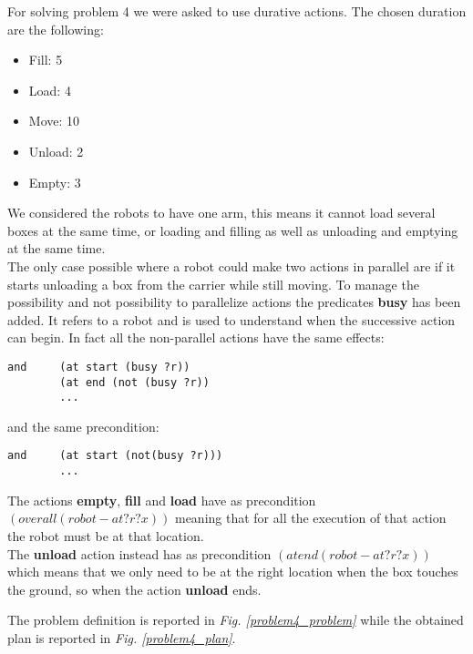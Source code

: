 For solving problem 4 we were asked to use durative actions.
The chosen duration are the following:
\begin{itemize}
    \item Fill: 5
    \item Load: 4
    \item Move: 10
    \item Unload: 2
    \item Empty: 3
\end{itemize}
We considered the robots to have one arm, this means it cannot load several boxes at the same time, or loading and filling as well as unloading and emptying at the same time.\\
The only case possible where a robot could make two actions in parallel are if it starts unloading a box from the carrier while still moving.
To manage the possibility and not possibility to parallelize actions the predicates \textbf{busy} has been added.
It refers to a robot and is used to understand when the successive action can begin.
In fact all the non-parallel actions have the same effects:
\begin{verbatim}
and     (at start (busy ?r))
        (at end (not (busy ?r))
        ...
\end{verbatim}
and the same precondition:
\begin{verbatim}
and     (at start (not(busy ?r)))
        ...
\end{verbatim}
The actions \textbf{empty}, \textbf{fill} and \textbf{load} have as precondition $(over all (robot-at ?r ?x))$
meaning that for all the execution of that action the robot must be at that location. \\
The \textbf{unload} action instead has as precondition $(at end(robot-at ?r ?x))$ which means that we only need to be at the right location
when the box touches the ground, so when the action \textbf{unload} ends.

The problem definition is reported in \textit{Fig. \ref{problem4_problem}} while the obtained plan is reported in \textit{Fig. \ref{problem4_plan}}.
